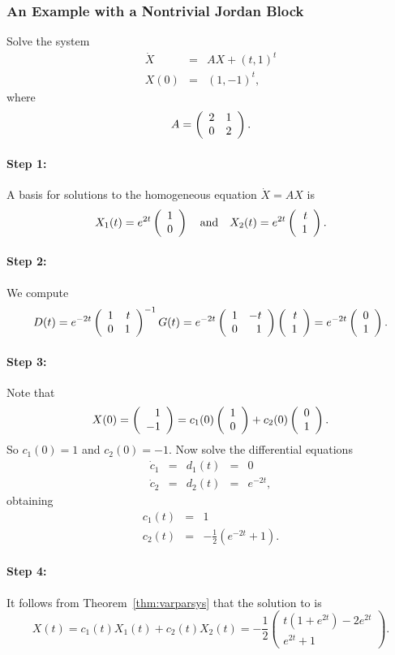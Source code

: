 \documentclass{ximera}
\begin{document}
\subsubsection*{An Example with a Nontrivial Jordan Block}

Solve the system
\begin{equation}  \label{e:2djb}
\begin{array}{rcl}
\dot{X} & = & A X + (t,1)^t \\
X(0) & = & (1,-1)^t,
\end{array}
\end{equation}
where 
\[
A = \left(\begin{array}{rr} 2 & 1\\ 0 &2\end{array}\right).
\]

\paragraph{Step 1:}  A basis for solutions to the homogeneous equation 
$\dot{X}=AX$ is
\[
X_1(t) = e^{2t}\left(\begin{array}{r} 1 \\ 0\end{array}\right) \quad\mbox{and}\quad X_2(t) = e^{2t}\left(\begin{array}{r} t \\ 1\end{array}\right).
\]

\paragraph{Step 2:}  We compute
\[
D(t) =  e^{-2t}\left(\begin{array}{rr} 1 & t\\ 0 &1\end{array}\right)^{-1} G(t) = 
e^{-2t}\left(\begin{array}{rr} 1 & -t\\ 0 &1\end{array}\right)\left(\begin{array}{r} t \\ 1\end{array}\right) = e^{-2t}\left(\begin{array}{r} 0 \\ 1\end{array}\right).
\]

\paragraph{Step 3:}  Note that 
\[
X(0) = \left(\begin{array}{r} 1 \\ -1\end{array}\right) = c_1(0)\left(\begin{array}{r} 1 \\ 0\end{array}\right) + c_2(0)\left(\begin{array}{r} 0 \\ 1\end{array}\right).
\]
So $c_1(0)=1$ and $c_2(0)=-1$.  Now solve the differential equations
\[
\begin{array}{rclcl}
\dot{c}_1 & = & d_1(t) & = & 0 \\
\dot{c}_2 & = & d_2(t) & = & e^{-2t},
\end{array}
\]
obtaining
\begin{eqnarray*}
c_1(t) & = & 1 \\
c_2(t) & = & -\frac{1}{2}(e^{-2t}+1).
\end{eqnarray*}

\paragraph{Step 4:}  It follows from Theorem~\ref{thm:varparsys} that the 
solution to  is
\[
X(t) = c_1(t)X_1(t) + c_2(t)X_2(t) = -\frac{1}{2}\left(\begin{array}{c}
t(1+e^{2t})-2e^{2t} \\ e^{2t}+1 \end{array}\right).
\]
 
\end{document}
